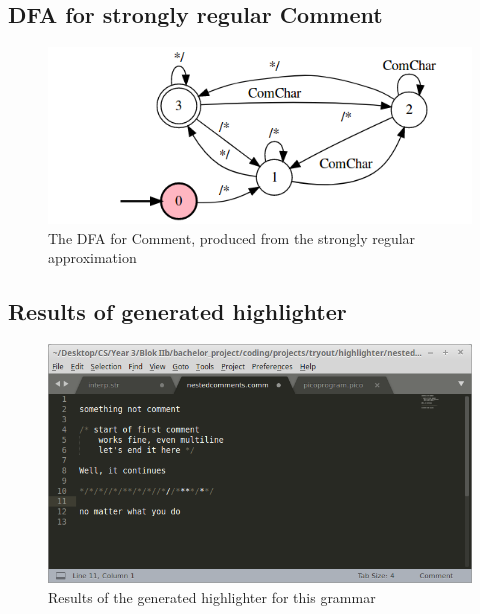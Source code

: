 \subsection{DFA for strongly regular Comment}
\begin{figure}[h!]
	\centering
	\includegraphics[width=\textwidth, keepaspectratio]{Figures/comment_dfa.png}
	\decoRule
 	\caption[DFA for Comment]{The DFA for Comment, produced from the strongly regular approximation}
 	\label{fig:comments:DFA:Comment}
\end{figure}

\pagebreak\subsection{Results of generated highlighter}
\begin{figure}[h!]
	\centering
	\includegraphics[width=\textwidth, keepaspectratio]{Figures/highlightShots/comment_generated.png}
	\decoRule
 	\caption[generated highlighter results for NestedComments grammar]{Results of the generated highlighter for this grammar}
 	\label{fig:comments:highlighter:generated}
\end{figure}

